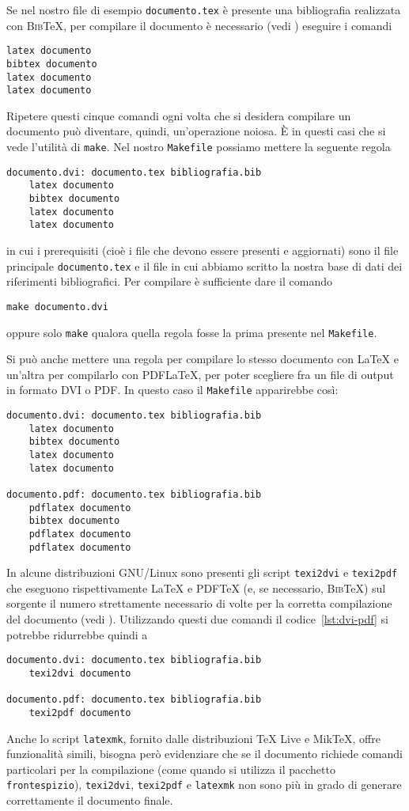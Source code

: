 Se nel nostro file di esempio \verb|documento.tex| è presente una bibliografia
realizzata con \textsc{Bib}\TeX, per compilare il documento è necessario (vedi
\textcite[120]{pantieri:latex}) eseguire i comandi
\begin{verbatim}
latex documento
bibtex documento
latex documento
latex documento
\end{verbatim}

Ripetere questi cinque comandi ogni volta che si desidera compilare un documento
può diventare, quindi, un'operazione noiosa.  È in questi casi che si vede
l'utilità di \verb|make|.  Nel nostro \verb|Makefile| possiamo mettere la
seguente regola
\begin{lstlisting}
documento.dvi: documento.tex bibliografia.bib
	latex documento
	bibtex documento
	latex documento
	latex documento
\end{lstlisting}
in cui i prerequisiti (cioè i file che devono essere presenti e aggiornati) sono
il file principale \verb|documento.tex| e il file in cui abbiamo scritto la
nostra base di dati dei riferimenti bibliografici.  Per compilare è sufficiente
dare il comando
\begin{verbatim}
make documento.dvi
\end{verbatim}
oppure solo \verb|make| qualora quella regola fosse la prima presente nel
\verb|Makefile|.

Si può anche mettere una regola per compilare lo stesso documento con \LaTeX{}
e un'altra per compilarlo con \textsc{PDF}\LaTeX, per poter scegliere fra un
file di output in formato \textsc{DVI} o \textsc{PDF}.  In questo caso il
\verb|Makefile| apparirebbe così:
\begin{lstlisting}[caption={La prima regola permette di compilare un documento con
\LaTeX, la seconda con \textsc{PDF}\LaTeX.},label=lst:dvi-pdf]
documento.dvi: documento.tex bibliografia.bib
	latex documento
	bibtex documento
	latex documento
	latex documento

documento.pdf: documento.tex bibliografia.bib
	pdflatex documento
	bibtex documento
	pdflatex documento
	pdflatex documento
\end{lstlisting}

In alcune distribuzioni GNU/Linux sono presenti gli script \verb|texi2dvi| e
\verb|texi2pdf| che eseguono rispettivamente \LaTeX{}
e \textsc{PDF}\TeX{}
(e, se necessario, \textsc{Bib}\TeX) sul sorgente il numero strettamente
necessario di volte per la corretta compilazione del documento (vedi
\textcite[63]{caucci:tabelle}).  Utilizzando questi due comandi il
codice~\ref{lst:dvi-pdf} si potrebbe ridurrebbe quindi a
\begin{lstlisting}
documento.dvi: documento.tex bibliografia.bib
	texi2dvi documento

documento.pdf: documento.tex bibliografia.bib
	texi2pdf documento
\end{lstlisting}
Anche lo script \verb|latexmk|, fornito dalle distribuzioni TeX Live e MikTeX,
offre funzionalità simili, bisogna però evidenziare che se il documento richiede
comandi particolari per la compilazione (come quando si utilizza il pacchetto
\verb|frontespizio|), \verb|texi2dvi|, \verb|texi2pdf| e \verb|latexmk| non sono
più in grado di generare correttamente il documento finale.

